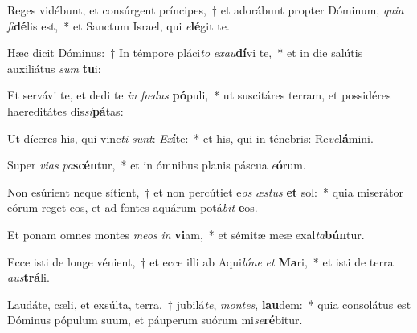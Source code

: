 \item Reges vidébunt, et consúrgent príncipes,~† et adorábunt propter Dóminum, \textit{qui}\textit{a} \textit{fi}\textbf{dé}lis est,~* et Sanctum Israel, qui \textit{e}\textbf{lé}git te.
\item Hæc dicit Dóminus:~† In témpore pláci\textit{to} \textit{ex}\textit{au}\textbf{dí}vi te,~* et in die salútis auxiliátus \textit{sum} \textbf{tu}i:
\item Et servávi te, et dedi te \textit{in} \textit{fœ}\textit{dus} \textbf{pó}puli,~* ut suscitáres terram, et possidéres haereditátes dis\textit{si}\textbf{pá}tas:
\item Ut díceres his, qui vinc\textit{ti} \textit{sunt}: \textit{Ex}\textbf{í}te:~* et his, qui in ténebris: Re\textit{ve}\textbf{lá}mini.
\item Super \textit{vi}\textit{as} \textit{pa}\textbf{scén}tur,~* et in ómnibus planis páscua \textit{e}\textbf{ó}rum.
\item Non esúrient neque sítient,~† et non percútiet e\textit{os} \textit{æs}\textit{tus} \textbf{et} sol:~* quia miserátor eórum reget eos, et ad fontes aquárum potá\textit{bit} \textbf{e}os.
\item Et ponam omnes montes \textit{me}\textit{os} \textit{in} \textbf{vi}am,~* et sémitæ meæ exal\textit{ta}\textbf{bún}tur.
\item Ecce isti de longe vénient,~† et ecce illi ab Aqui\textit{ló}\textit{ne} \textit{et} \textbf{Ma}ri,~* et isti de terra \textit{aus}\textbf{trá}li.
\item Laudáte, cæli, et exsúlta, terra,~† jubilá\textit{te}, \textit{mon}\textit{tes}, \textbf{lau}dem:~* quia consolátus est Dóminus pópulum suum, et páuperum suórum mi\textit{se}\textbf{ré}bitur.
